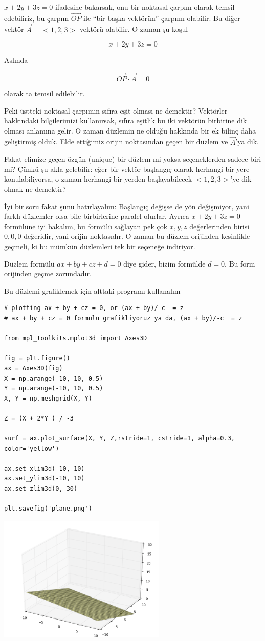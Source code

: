 \documentclass[12pt,fleqn]{article}\usepackage{../../common}
\begin{document}
$x + 2y + 3z = 0$ ifadesine bakarsak, onu bir noktasal çarpım olarak temsil
edebiliriz, bu çarpım $\vec{OP}$ ile ``bir başka vektörün'' çarpımı
olabilir. Bu diğer vektör $\vec{A} = <1,2,3>$ vektörü olabilir. O zaman şu koşul

$$ x + 2y + 3z = 0 $$

Aslında

$$ \vec{OP} \cdot \vec{A} = 0 $$

olarak ta temsil edilebilir.

Peki üstteki noktasal çarpımın sıfıra eşit olması ne demektir? Vektörler
hakkındaki bilgilerimizi kullanırsak, sıfıra eşitlik bu iki vektörün
birbirine dik olması anlamına gelir. O zaman düzlemin ne olduğu hakkında
bir ek bilinç daha geliştirmiş olduk. Elde ettiğimiz orijin noktasından
geçen bir düzlem ve $\vec{A}$'ya dik. 

Fakat elimize geçen özgün (unique) bir düzlem mi yoksa seçeneklerden sadece
biri mi? Çünkü şu akla gelebilir: eğer bir vektör başlangıç olarak herhangi
bir yere konulabiliyorsa, o zaman herhangi bir yerden başlayabilecek
$< 1,2,3 >$'ye dik olmak ne demektir?

İyi bir soru fakat şunu hatırlayalım: Başlangıç değişse de yön değişmiyor,
yani farklı düzlemler olsa bile birbirlerine paralel olurlar. Ayrıca $x +
2y + 3z = 0$ formülüne iyi bakalım, bu formülü sağlayan pek çok $x,y,z$
değerlerinden birisi $0,0,0$ değeridir, yani orijin noktasıdır. O zaman bu
düzlem orijinden kesinlikle geçmeli, ki bu mümkün düzlemleri tek bir
seçeneğe indiriyor.

Düzlem formülü $ax + by + cz + d= 0$ diye gider, bizim formülde $d=0$. Bu
form orijinden geçme zorundadır.

Bu düzlemi grafiklemek için alttaki programı kullanalım

\begin{verbatim}
# plotting ax + by + cz = 0, or (ax + by)/-c  = z 
# ax + by + cz = 0 formulu grafikliyoruz ya da, (ax + by)/-c  = z 

from mpl_toolkits.mplot3d import Axes3D

fig = plt.figure()
ax = Axes3D(fig)
X = np.arange(-10, 10, 0.5)
Y = np.arange(-10, 10, 0.5)
X, Y = np.meshgrid(X, Y)

Z = (X + 2*Y ) / -3

surf = ax.plot_surface(X, Y, Z,rstride=1, cstride=1, alpha=0.3, color='yellow')

ax.set_xlim3d(-10, 10)
ax.set_ylim3d(-10, 10)
ax.set_zlim3d(0, 30)

plt.savefig('plane.png')
\end{verbatim}
\includegraphics[height=6cm]{plane.png}
\end{document}

